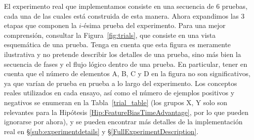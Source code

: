 El experimento real que implementamos consiste en una secuencia de 6 pruebas, cada una de las cuales está construida de esta manera. Ahora expandimos las 3 etapas que componen la $i$-ésima prueba del experimento. Para una mejor comprensión, consultar la Figura~\ref{fig:trials}, que consiste en una vista esquemática de una prueba. Tenga en cuenta que esta figura es meramente ilustrativa y no pretende describir los detalles de una prueba, sino más bien la secuencia de fases y el flujo lógico dentro de una prueba. En particular, tener en cuenta que el número de elementos {\sf A}, {\sf B}, {\sf C} y {\sf D} en la figura no son significativos, ya que varían de prueba en prueba a lo largo del experimento. Los conceptos reales utilizados en cada ensayo, así como el número de ejemplos positivos y negativos se enumeran en la Tabla~\ref{trial_table} (los grupos X, Y solo son relevantes para la Hipótesis \ref{Hip:FeatureBiasTimeAdvantage}, por lo que pueden ignorarse por ahora), y se pueden encontrar más detalles de la implementación real en \S\ref{sub:experimentdetails} y \S\ref{FullExperimentDescription}.  
